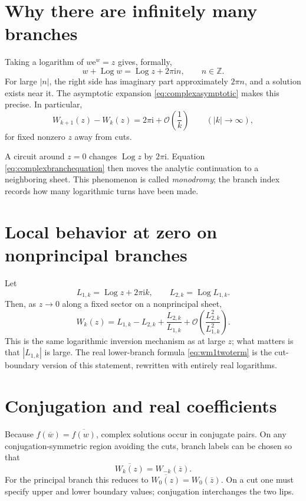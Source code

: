 \documentclass[11pt,oneside]{book}
\theoremstyle{definition}
\theoremstyle{remark}
\newcommand{\ee}{\mathrm e}
\newcommand{\ii}{\mathrm i}
\newcommand{\Log}{\operatorname{Log}}
\newcommand{\Z}{\mathbb Z}
\newcommand{\bigO}{\mathcal O}
\begin{document}
\section{Why there are infinitely many branches}

Taking a logarithm of $w\ee^w=z$ gives, formally,
\begin{equation}\label{eq:complexbranchequation}
 w+\Log w=\Log z+2\pi\ii n,
 \qquad n\in\Z.
\end{equation}
For large $|n|$, the right side has imaginary part approximately $2\pi n$,
and a solution exists near it.  The asymptotic expansion
\eqref{eq:complexasymptotic} makes this precise.  In particular,
\begin{equation}\label{eq:branchspacing}
 W_{k+1}(z)-W_k(z)=2\pi\ii+\bigO\!\left(\frac1k\right)
 \qquad(|k|\to\infty),
\end{equation}
for fixed nonzero $z$ away from cuts.

A circuit around $z=0$ changes $\Log z$ by $2\pi\ii$.  Equation
\eqref{eq:complexbranchequation} then moves the analytic continuation to a
neighboring sheet.  This phenomenon is called \emph{monodromy}; the branch
index records how many logarithmic turns have been made.

\section{Local behavior at zero on nonprincipal branches}

Let
\[
 L_{1,k}=\Log z+2\pi\ii k,
 \qquad L_{2,k}=\Log L_{1,k}.
\]
Then, as $z\to0$ along a fixed sector on a nonprincipal sheet,
\begin{equation}\label{eq:nonprincipalzero}
 W_k(z)=L_{1,k}-L_{2,k}
 +\frac{L_{2,k}}{L_{1,k}}
 +\bigO\!\left(\frac{L_{2,k}^2}{L_{1,k}^2}\right).
\end{equation}
This is the same logarithmic inversion mechanism as at large $z$; what matters
is that $|L_{1,k}|$ is large.  The real lower-branch formula
\eqref{eq:wm1twoterm} is the cut-boundary version of this statement, rewritten
with entirely real logarithms.

\section{Conjugation and real coefficients}

Because $f(\overline w)=\overline{f(w)}$, complex solutions occur in conjugate
pairs.  On any conjugation-symmetric region avoiding the cuts, branch labels
can be chosen so that
\begin{equation}\label{eq:conjugation}
 \overline{W_k(z)}=W_{-k}(\overline z).
\end{equation}
For the principal branch this reduces to
$\overline{W_0(z)}=W_0(\overline z)$.  On a cut one must specify upper and
lower boundary values; conjugation interchanges the two lips.
\end{document}
